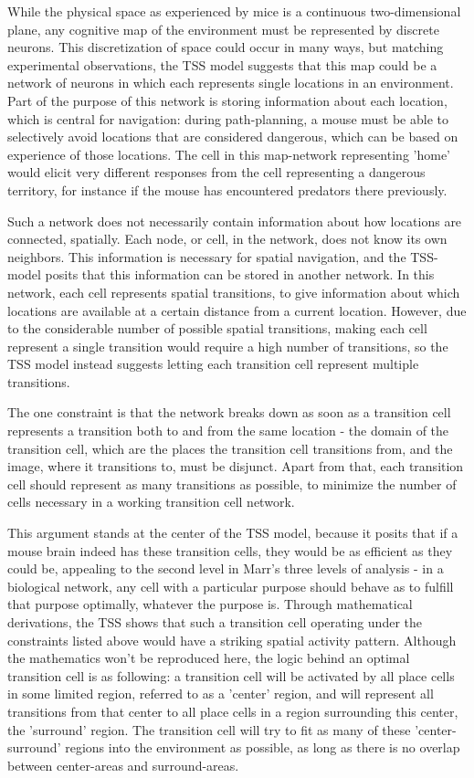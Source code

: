 \documentclass{article}
\begin{document}
    While the physical space as experienced by mice is a continuous two-dimensional plane, any cognitive map of the environment must be represented by discrete neurons. This discretization of space could occur in many ways, but matching experimental observations, the TSS model suggests that this map could be a network of neurons in which each represents single locations in an environment. Part of the purpose of this network is storing information about each location, which is central for navigation: during path-planning, a mouse must be able to selectively avoid locations that are considered dangerous, which can be based on experience of those locations. The cell in this map-network representing 'home' would elicit very different responses from the cell representing a dangerous territory, for instance if the mouse has encountered predators there previously.

    Such a network does not necessarily contain information about how locations are connected, spatially. Each node, or cell, in the network, does not know its own neighbors. This information is necessary for spatial navigation, and the TSS-model posits that this information can be stored in another network. In this network, each cell represents spatial transitions, to give information about which locations are available at a certain distance from a current location. However, due to the considerable number of possible spatial transitions, making each cell represent a single transition would require a high number of transitions, so the TSS model instead suggests letting each transition cell represent multiple transitions.

    The one constraint is that the network breaks down as soon as a transition cell represents a transition both to and from the same location - the domain of the transition cell, which are the places the transition cell transitions from, and the image, where it transitions to, must be disjunct. Apart from that, each transition cell should represent as many transitions as possible, to minimize the number of cells necessary in a working transition cell network.

    This argument stands at the center of the TSS model, because it posits that if a mouse brain indeed has these transition cells, they would be as efficient as they could be, appealing to the second level in Marr's three levels of analysis - in a biological network, any cell with a particular purpose should behave as to fulfill that purpose optimally, whatever the purpose is.
    Through mathematical derivations, the TSS shows that such a transition cell operating under the constraints listed above would have a striking spatial activity pattern. Although the mathematics won't be reproduced here, the logic behind an optimal transition cell is as following:
    a transition cell will be activated by all place cells in some limited region, referred to as a 'center' region, and will represent all transitions from that center to all place cells in a region surrounding this center, the 'surround' region. The transition cell will try to fit as many of these 'center-surround' regions into the environment as possible, as long as there is no overlap between center-areas and surround-areas.
\end{document}
